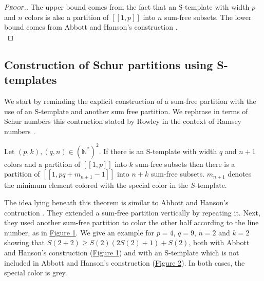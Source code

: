 \begin{proof}[\textsc{Proof.}]
The upper bound comes from the fact that an S-template with width \(p\) and \(n\) colors is also a partition of \([\![1, p]\!]\) 
into \(n\) sum-free subsets. The lower bound comes from Abbott and Hanson's construction \cite{AbbottHanson}. \\
\end{proof}


\subsection{Construction of Schur partitions using S-templates}

We start by reminding the explicit construction of a sum-free partition with the use of an S-template and another sum free partition. 
We rephrase in terms of Schur numbers this contruction stated by Rowley in the context of Ramsey numbers \cite{RowleyRamsey}.

\begin{theorem}
\label{thm:Stemp}
	Let \((p,k), (q,n) \in (\mathbb{N}^*)^2\). If there is an S-template with width \(q\) and \(n+1\) colors 
	and a partition of \([\![1,p]\!]\) into \(k\) sum-free subsets then there is a partition of \([\![1,pq+m_{n+1}
	-1]\!]\) into \(n+k\) sum-free subsets. \(m_{n+1}\) denotes the minimum element colored with the special color in the \(S\)-template.
\end{theorem}

The idea lying beneath this theorem is similar to Abbott and Hanson's contruction \cite{AbbottHanson}. They 
extended a sum-free partition vertically by repeating it. Next, they used another sum-free partition to color the other half according 
to the line number, as in \hyperref[figure:1]{Figure 1}. We give an example for \(p = 4\), 
\(q = 9\), \(n = 2\) and \(k = 2\) showing that \(S(2 + 2) \geqslant S(2) \left(2 S(2) + 1\right) + S(2)\), both with Abbott and 
Hanson's construction (\hyperref[figure:1]{Figure 1}) and with an S-template which is not included in Abbott and Hanson's construction 
(\hyperref[figure:2]{Figure 2}). In both cases, the special color is grey.

